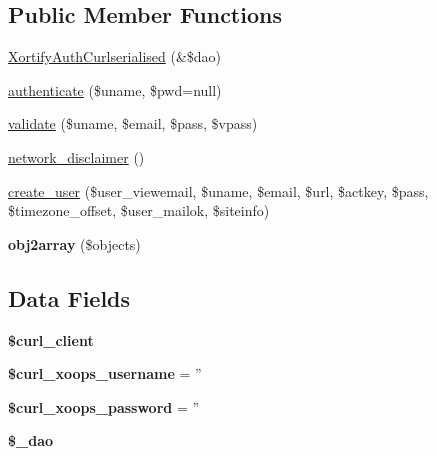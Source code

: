 \subsection*{Public Member Functions}
\begin{DoxyCompactItemize}
\item 
\hyperlink{class_xortify_auth_curlserialised_a5a69ea149424b5e92245daaa880dbb43}{Xortify\-Auth\-Curlserialised} (\&\$dao)
\item 
\hyperlink{class_xortify_auth_curlserialised_a00678ba307326b734e6c679f28bea315}{authenticate} (\$uname, \$pwd=null)
\item 
\hyperlink{class_xortify_auth_curlserialised_a91121a1b702dfd20fb65a027c8ed26ec}{validate} (\$uname, \$email, \$pass, \$vpass)
\item 
\hyperlink{class_xortify_auth_curlserialised_a1874c27b6f81a3f2ff9015405ad0f8bc}{network\-\_\-disclaimer} ()
\item 
\hyperlink{class_xortify_auth_curlserialised_ac72efc5ad313a592cf6706876f56f7ec}{create\-\_\-user} (\$user\-\_\-viewemail, \$uname, \$email, \$url, \$actkey, \$pass, \$timezone\-\_\-offset, \$user\-\_\-mailok, \$siteinfo)
\item 
\hypertarget{class_xortify_auth_curlserialised_aabc52e4f78557f0e0b360a8aaba6e11d}{{\bfseries obj2array} (\$objects)}\label{class_xortify_auth_curlserialised_aabc52e4f78557f0e0b360a8aaba6e11d}

\end{DoxyCompactItemize}
\subsection*{Data Fields}
\begin{DoxyCompactItemize}
\item 
\hypertarget{class_xortify_auth_curlserialised_a402f2112991f3227835af80e9df33e38}{{\bfseries \$curl\-\_\-client}}\label{class_xortify_auth_curlserialised_a402f2112991f3227835af80e9df33e38}

\item 
\hypertarget{class_xortify_auth_curlserialised_aab7480ba9f878a02b2c9fd43922fa070}{{\bfseries \$curl\-\_\-xoops\-\_\-username} = ''}\label{class_xortify_auth_curlserialised_aab7480ba9f878a02b2c9fd43922fa070}

\item 
\hypertarget{class_xortify_auth_curlserialised_a6c9851541ed3826c67cfe7224c38f0b8}{{\bfseries \$curl\-\_\-xoops\-\_\-password} = ''}\label{class_xortify_auth_curlserialised_a6c9851541ed3826c67cfe7224c38f0b8}

\item 
\hypertarget{class_xortify_auth_curlserialised_a12a029c610f699b4b25e79a1f64a3485}{{\bfseries \$\-\_\-dao}}\label{class_xortify_auth_curlserialised_a12a029c610f699b4b25e79a1f64a3485}

\end{DoxyCompactItemize}


